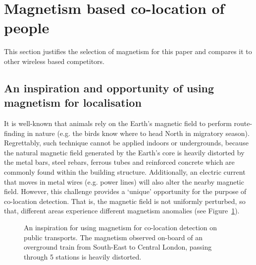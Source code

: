 \documentclass[conference]{IEEEtran}
\begin{document}
\section{Magnetism based co-location of people}
This section justifies the selection of magnetism for this paper and compares it to other wireless based competitors.

\subsection{An inspiration and opportunity of using magnetism for localisation}
It is well-known that animals rely on the Earth's magnetic field to perform route-finding in nature (e.g. the birds know where to head North in migratory season). Regrettably, such technique cannot be applied indoors or undergrounds, because the natural magnetic field generated by the Earth's core is heavily distorted by the metal bars, steel rebars, ferrous tubes and reinforced concrete which are commonly found within the building structure. Additionally, an electric current that moves in metal wires (e.g. power lines) will also alter the nearby magnetic field. However, this challenge provides a `unique' opportunity for the purpose of co-location detection. That is, the magnetic field is not uniformly perturbed, so that, different areas experience different magnetism anomalies (see Figure~\ref{magnetismdulwichbridge}).
\begin{figure}[!t]
	\centering
	
	\hfil
	\hfil
	
	\caption{An inspiration for using magnetism for co-location detection on public transports. The magnetism observed on-board of an overground train from South-East to Central London, passing through 5 stations is heavily distorted.}
	\label{magnetismdulwichbridge}
\end{figure}
\end{document}
